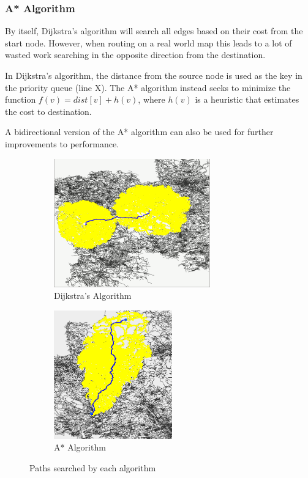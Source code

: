 \documentclass[ %
                    author={Alexander Hill},
                supervisor={Dr. Benjamin Sach},
                    degree={MEng},
                     title={MARMOSET},
                  subtitle={Multi-Agent Route Management using Online Simulation for Efficient Transportation},
                      type={research},
                      year={2016} ]{dissertation}
\begin{document}
\subsubsection{A* Algorithm}

By itself, Dijkstra's algorithm will search all edges based on their cost from
the start node. However, when routing on a real world map this leads to a lot of
wasted work searching in the opposite direction from the destination.

In Dijkstra's algorithm, the distance from the source node is used as the key in
the priority queue (line X). The A* algorithm instead seeks to minimize the
function $f(v) = dist[v] + h(v)$, where $h(v)$ is a heuristic that estimates the
cost to destination.

A bidirectional version of the A* algorithm can also be used for further
improvements to performance.

\begin{figure}[h]
\centering
\begin{subfigure}[b]{0.4\textwidth}
    \centering
    \includegraphics[height=15em]{bidijkstra-city}
    \caption{Dijkstra's Algorithm}\label{fig:bidijkstra}
\end{subfigure}
\hspace{2em}
\begin{subfigure}[b]{0.4\textwidth}
    \centering
    \includegraphics[height=15em]{astar-city}
    \caption{A* Algorithm}\label{fig:astar}
\end{subfigure}
\caption{Paths searched by each algorithm}
\end{figure}
\end{document}
